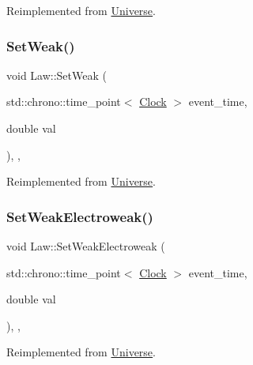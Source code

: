 Reimplemented from \mbox{\hyperlink{classUniverse_a1b2d6197ddf3d613cc30bd04d22ed8b7}{Universe}}.

\mbox{\label{classLaw_a1009b4e0bc0b91f41d48dc137529e97b}} 
\subsubsection{\texorpdfstring{Set\+Weak()}{SetWeak()}}
{\footnotesize\ttfamily void Law\+::\+Set\+Weak (\begin{DoxyParamCaption}\item[{std\+::chrono\+::time\+\_\+point$<$ \mbox{\hyperlink{universe_8h_a0ef8d951d1ca5ab3cfaf7ab4c7a6fd80}{Clock}} $>$}]{event\+\_\+time,  }\item[{double}]{val }\end{DoxyParamCaption})\hspace{0.3cm}{\ttfamily [inline]}, {\ttfamily [final]}, {\ttfamily [virtual]}}



Reimplemented from \mbox{\hyperlink{classUniverse_a0f5cd04081b41ee931c0557dc397f6fb}{Universe}}.

\mbox{\label{classLaw_a65e5e757041c1e72bb046eccbb6d66db}} 
\subsubsection{\texorpdfstring{Set\+Weak\+Electroweak()}{SetWeakElectroweak()}}
{\footnotesize\ttfamily void Law\+::\+Set\+Weak\+Electroweak (\begin{DoxyParamCaption}\item[{std\+::chrono\+::time\+\_\+point$<$ \mbox{\hyperlink{universe_8h_a0ef8d951d1ca5ab3cfaf7ab4c7a6fd80}{Clock}} $>$}]{event\+\_\+time,  }\item[{double}]{val }\end{DoxyParamCaption})\hspace{0.3cm}{\ttfamily [inline]}, {\ttfamily [final]}, {\ttfamily [virtual]}}



Reimplemented from \mbox{\hyperlink{classUniverse_a2d3d642bfdc863248e93535832fa4b00}{Universe}}.

\mbox{\label{classLaw_a0240b10c679b671039dbf10771342ea7}} 
